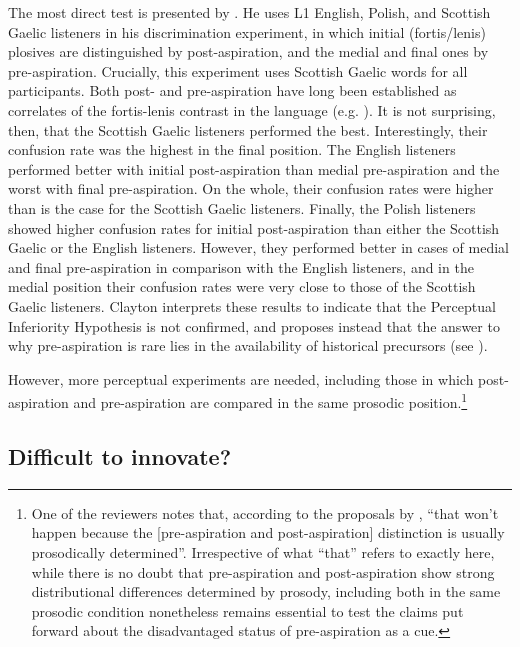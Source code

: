 \documentclass[output=paper]{langscibook}
\begin{document}
The most direct test is presented by \citet[95--107]{Clayton2010}. He uses L1 English, Polish, and Scottish Gaelic listeners in his discrimination experiment, in which initial (fortis/lenis) plosives are distinguished by post-aspiration, and the medial and final ones by pre-aspiration. Crucially, this experiment uses Scottish Gaelic words for all participants. Both post- and pre\hyp aspiration have long been established as correlates of the fortis-lenis contrast in the language (e.g. \citealt{NanceStuart-Smith2013}). It is not surprising, then, that the Scottish Gaelic listeners performed the best. Interestingly, their confusion rate was the highest in the final position. The English listeners performed better with initial post-aspiration than medial pre\hyp aspiration and the worst with final pre-aspiration. On the whole, their confusion rates were higher than is the case for the Scottish Gaelic listeners. Finally, the Polish listeners showed higher confusion rates for initial post-aspiration than either the Scottish Gaelic or the English listeners. However, they performed better in cases of medial and final pre\hyp aspiration in comparison with the English listeners, and in the medial position their confusion rates were very close to those of the Scottish Gaelic listeners. Clayton interprets these results to indicate that the Perceptual Inferiority Hypothesis is not confirmed, and proposes instead that the answer to why pre\hyp aspiration is rare lies in the availability of historical precursors (see ).

However, more perceptual experiments are needed, including those in which post-aspiration and pre\hyp aspiration are compared in the same prosodic position.\footnote{One of the reviewers notes that, according to the proposals by \textcite{KehreinGolston2004, GolstonKehrein2013}, “that won’t happen because the [pre-aspiration and post-aspiration] distinction is usually prosodically determined”. Irrespective of what “that” refers to exactly here, while there is no doubt that pre\hyp aspiration and post-aspiration show strong distributional differences determined by prosody, including both in the same prosodic condition nonetheless remains essential to test the claims put forward about the disadvantaged status of pre\hyp aspiration as a cue.}

\subsection{Difficult to innovate?} \label{sec:hejna:4.2}
\end{document}
